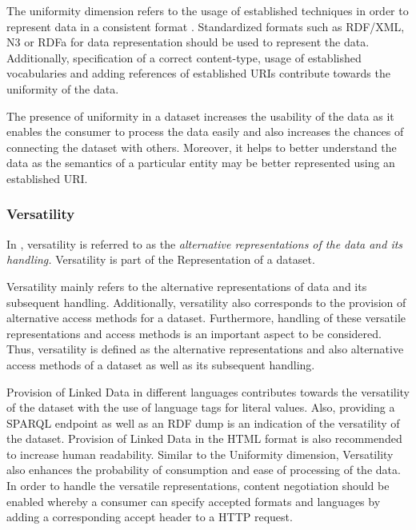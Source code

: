 \begin{definition}[Uniformity]
The uniformity dimension refers to the usage of established techniques in order to represent data in a consistent format . 
Standardized formats such as RDF/XML, N3 or RDFa for data representation should be used to represent the data. 
Additionally, specification of a correct content-type, usage of established vocabularies and adding references of established URIs contribute towards the uniformity of the data. 
\end{definition}

The presence of uniformity in a dataset increases the usability of the data as it enables the consumer to process the data easily and also increases the chances of connecting the dataset with others.
Moreover, it helps to better understand the data as the semantics of a particular entity may be better represented using an established URI.

\subsubsection{Versatility} 
In \cite{Flemming}, versatility is referred to as the \emph{alternative representations of the data and its handling.}
Versatility is part of the Representation of a dataset.

\begin{definition}[Versatility]
Versatility mainly refers to the alternative representations of data and its subsequent handling. 
Additionally, versatility also corresponds to the provision of alternative access methods for a dataset.
Furthermore, handling of these versatile representations and access methods is an important aspect to be considered. 
Thus, versatility is defined as the alternative representations and also alternative access methods of a dataset as well as its subsequent handling. 
\end{definition}

Provision of Linked Data in different languages contributes towards the versatility of the dataset with the use of language tags for literal values.
Also, providing a SPARQL endpoint as well as an RDF dump is an indication of the versatility of the dataset.
Provision of Linked Data in the HTML format is also recommended to increase human readability.  
Similar to the Uniformity dimension, Versatility also enhances the probability of consumption and ease of processing of the data.
In order to handle the versatile representations, content negotiation should be enabled whereby a consumer can specify accepted formats and languages by adding a corresponding accept header to a HTTP request. 

